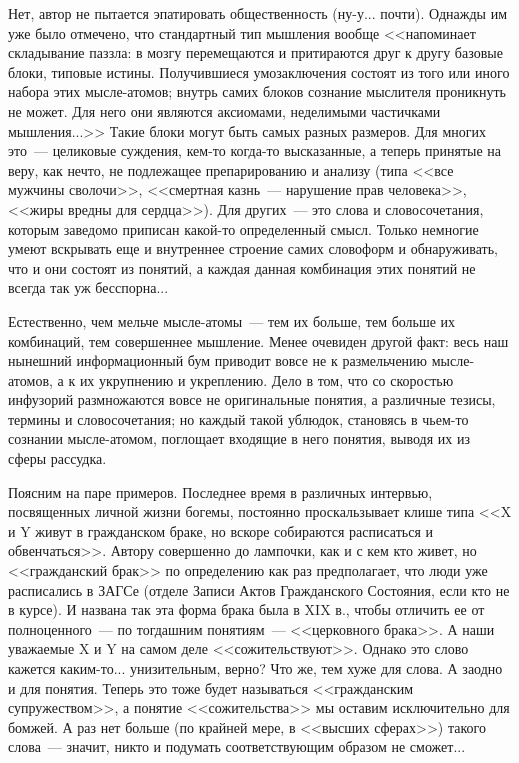 \documentclass{scrbook}
\newcommand{\flqq}{<<}
\newcommand{\frqq}{>>}
\newcommand{\mdash}{~--- }
\begin{document}
Нет, автор не пытается эпатировать общественность (ну-у... почти). Однажды им уже было отмечено, что стандартный тип мышления вообще {\flqq}напоминает складывание паззла: в мозгу перемещаются и притираются друг к другу базовые блоки, типовые истины. Получившиеся умозаключения состоят из того или иного набора этих мысле-атомов; внутрь самих блоков сознание мыслителя проникнуть не может. Для него они являются аксиомами, неделимыми частичками мышления...{\frqq} Такие блоки могут быть самых разных размеров. Для многих это{\mdash}целиковые суждения, кем-то когда-то высказанные, а теперь принятые на веру, как нечто, не подлежащее препарированию и анализу (типа {\flqq}все мужчины сволочи{\frqq}, {\flqq}смертная казнь{\mdash}нарушение прав человека{\frqq}, {\flqq}жиры вредны для сердца{\frqq}). Для других{\mdash}это слова и словосочетания, которым заведомо приписан какой-то определенный смысл. Только немногие умеют вскрывать еще и внутреннее строение самих словоформ и обнаруживать, что и они состоят из понятий, а каждая данная комбинация этих понятий не всегда так уж бесспорна...

Естественно, чем мельче мысле-атомы{\mdash}тем их больше, тем больше их комбинаций, тем совершеннее мышление. Менее очевиден другой факт: весь наш нынешний информационный бум приводит вовсе не к размельчению мысле-атомов, а к их укрупнению и укреплению. Дело в том, что со скоростью инфузорий размножаются вовсе не оригинальные понятия, а различные тезисы, термины и словосочетания; но каждый такой ублюдок, становясь в чьем-то сознании мысле-атомом, поглощает входящие в него понятия, выводя их из сферы рассудка.

Поясним на паре примеров. Последнее время в различных интервью, посвященных личной жизни богемы, постоянно проскальзывает клише типа {\flqq}X и Y живут в гражданском браке, но вскоре собираются расписаться и обвенчаться{\frqq}. Автору совершенно до лампочки, как и с кем кто живет, но {\flqq}гражданский брак{\frqq} по определению как раз предполагает, что люди уже расписались в ЗАГСе (отделе Записи Актов Гражданского Состояния, если кто не в курсе). И названа так эта форма брака была в XIX в., чтобы отличить ее от полноценного{\mdash}по тогдашним понятиям{\mdash}{\flqq}церковного брака{\frqq}. А наши уважаемые X и Y на самом деле {\flqq}сожительствуют{\frqq}. Однако это слово кажется каким-то... унизительным, верно? Что же, тем хуже для слова. А заодно и для понятия. Теперь это тоже будет называться {\flqq}гражданским супружеством{\frqq}, а понятие {\flqq}сожительства{\frqq} мы оставим исключительно для бомжей. А раз нет больше (по крайней мере, в {\flqq}высших сферах{\frqq}) такого слова{\mdash}значит, никто и подумать соответствующим образом не сможет...
\end{document}
